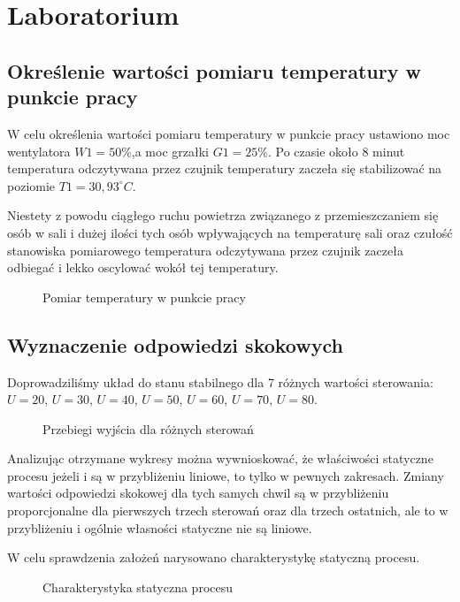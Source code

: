 \chapter{Laboratorium}

\section{Określenie wartości pomiaru temperatury w punkcie pracy}

W celu określenia wartości pomiaru temperatury w punkcie pracy ustawiono moc wentylatora  $W1 = 50\%$,a moc grzałki $G1 = 25\%$.
Po czasie około 8 minut temperatura odczytywana przez czujnik temperatury zaczeła się stabilizować  na poziomie  $T1 = 30,93^{\circ} C$.

Niestety z powodu ciągłego ruchu powietrza związanego z przemieszczaniem się osób w sali i dużej ilości tych osób wpływających na temperaturę sali oraz czułość stanowiska pomiarowego temperatura odczytywana przez czujnik zaczeła odbiegać i lekko oscylować wokół tej temperatury.

\begin{figure}[H]
\centering

\caption{Pomiar temperatury w punkcie pracy}
\end{figure}

\section{Wyznaczenie odpowiedzi skokowych}

Doprowadziliśmy układ do stanu stabilnego dla 7 różnych wartości sterowania: $U = 20$, $U = 30$, $U = 40$, $U = 50$, $U = 60$, $U = 70$, $U = 80$.

\begin{figure}[H]
\centering

\caption{Przebiegi wyjścia dla różnych sterowań}
\end{figure}

Analizując otrzymane wykresy można wywnioskować, że właściwości statyczne procesu jeżeli i są w przybliżeniu liniowe, to tylko w pewnych zakresach. Zmiany wartości odpowiedzi skokowej dla tych samych chwil są w przybliżeniu proporcjonalne dla pierwszych trzech sterowań oraz dla trzech ostatnich, ale to w przybliżeniu i ogólnie własności statyczne nie są liniowe.

W celu sprawdzenia założeń narysowano charakterystykę statyczną procesu.

\begin{figure}[H]
\centering

\caption{Charakterystyka statyczna procesu}
\end{figure}

